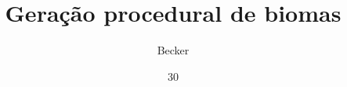 \documentclass[tg]{mdtuffs}
\title{Geração procedural de biomas}
\author{Becker}{João Carlos}
\institute{Ciência da Computação}
\date{30}{Junho}{2017}
\begin{document}
\maketitle




\makeapprove





\end{document}
